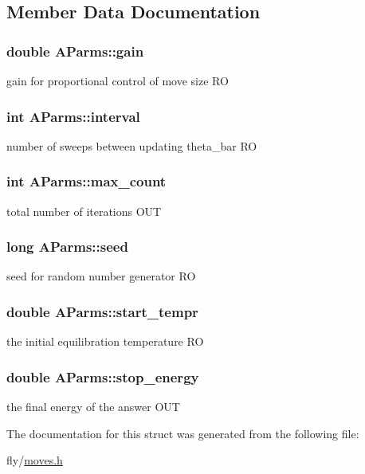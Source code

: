 \subsection{Member Data Documentation}
\hypertarget{structAParms_a6a943f20f9124e8ce88d43c80fab2ed2}{
\subsubsection[{gain}]{\setlength{\rightskip}{0pt plus 5cm}double {\bf AParms::gain}}}
\label{structAParms_a6a943f20f9124e8ce88d43c80fab2ed2}
gain for proportional control of move size RO \hypertarget{structAParms_a625153becccab120e5f0518ac2a855f4}{
\subsubsection[{interval}]{\setlength{\rightskip}{0pt plus 5cm}int {\bf AParms::interval}}}
\label{structAParms_a625153becccab120e5f0518ac2a855f4}
number of sweeps between updating theta\_\-bar RO \hypertarget{structAParms_a48486c83137ebc42a2970b33a84cbfc6}{
\subsubsection[{max\_\-count}]{\setlength{\rightskip}{0pt plus 5cm}int {\bf AParms::max\_\-count}}}
\label{structAParms_a48486c83137ebc42a2970b33a84cbfc6}
total number of iterations OUT \hypertarget{structAParms_a7d69899585ac92b3045262f10cf3ed31}{
\subsubsection[{seed}]{\setlength{\rightskip}{0pt plus 5cm}long {\bf AParms::seed}}}
\label{structAParms_a7d69899585ac92b3045262f10cf3ed31}
seed for random number generator RO \hypertarget{structAParms_a012f0843a73cde4e53d40656ac280276}{
\subsubsection[{start\_\-tempr}]{\setlength{\rightskip}{0pt plus 5cm}double {\bf AParms::start\_\-tempr}}}
\label{structAParms_a012f0843a73cde4e53d40656ac280276}
the initial equilibration temperature RO \hypertarget{structAParms_a9ddd20061cfb023dc042adcc611c26cf}{
\subsubsection[{stop\_\-energy}]{\setlength{\rightskip}{0pt plus 5cm}double {\bf AParms::stop\_\-energy}}}
\label{structAParms_a9ddd20061cfb023dc042adcc611c26cf}
the final energy of the answer OUT 

The documentation for this struct was generated from the following file:\begin{DoxyCompactItemize}
\item 
fly/\hyperlink{moves_8h}{moves.h}\end{DoxyCompactItemize}
